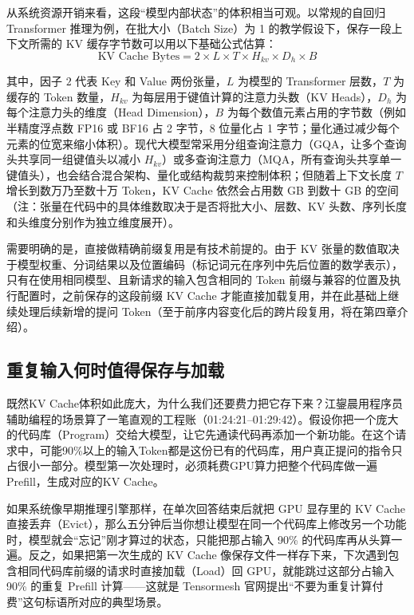\documentclass[UTF8,a4paper,11pt,fontset=fandol]{ctexart}
\begin{document}
从系统资源开销来看，这段“模型内部状态”的体积相当可观。以常规的自回归 Transformer 推理为例，在批大小（Batch Size）为 1 的教学假设下，保存一段上下文所需的 KV 缓存字节数可以用以下基础公式估算：
\[
\text{KV Cache Bytes} = 2 \times L \times T \times H_{kv} \times D_h \times B
\]

其中，因子 \(2\) 代表 Key 和 Value 两份张量，\(L\) 为模型的 Transformer 层数，\(T\) 为缓存的 Token 数量，\(H_{kv}\) 为每层用于键值计算的注意力头数（KV Heads），\(D_h\) 为每个注意力头的维度（Head Dimension），\(B\) 为每个数值元素占用的字节数（例如半精度浮点数 FP16 或 BF16 占 2 字节，8 位量化占 1 字节；量化通过减少每个元素的位宽来缩小体积）。现代大模型常采用分组查询注意力（GQA，让多个查询头共享同一组键值头以减小 \(H_{kv}\)）或多查询注意力（MQA，所有查询头共享单一键值头），也会结合混合架构、量化或结构裁剪来控制体积；但随着上下文长度 \(T\) 增长到数万乃至数十万 Token，KV Cache 依然会占用数 GB 到数十 GB 的空间（注：张量在代码中的具体维数取决于是否将批大小、层数、KV 头数、序列长度和头维度分别作为独立维度展开）。

需要明确的是，直接做精确前缀复用是有技术前提的。由于 KV 张量的数值取决于模型权重、分词结果以及位置编码（标记词元在序列中先后位置的数学表示），只有在使用相同模型、且新请求的输入包含相同的 Token 前缀与兼容的位置及执行配置时，之前保存的这段前缀 KV Cache 才能直接加载复用，并在此基础上继续处理后续新增的提问 Token（至于前序内容变化后的跨片段复用，将在第四章介绍）。

\subsection{重复输入何时值得保存与加载}
既然KV Cache体积如此庞大，为什么我们还要费力把它存下来？江鋆晨用程序员辅助编程的场景算了一笔直观的工程账（01:24:21–01:29:42）。假设你把一个庞大的代码库（Program）交给大模型，让它先通读代码再添加一个新功能。在这个请求中，可能90\%以上的输入Token都是这份已有的代码库，用户真正提问的指令只占很小一部分。模型第一次处理时，必须耗费GPU算力把整个代码库做一遍Prefill，生成对应的KV Cache。

如果系统像早期推理引擎那样，在单次回答结束后就把 GPU 显存里的 KV Cache 直接丢弃（Evict），那么五分钟后当你想让模型在同一个代码库上修改另一个功能时，模型就会“忘记”刚才算过的状态，只能把那占输入 90\% 的代码库再从头算一遍。反之，如果把第一次生成的 KV Cache 像保存文件一样存下来，下次遇到包含相同代码库前缀的请求时直接加载（Load）回 GPU，就能跳过这部分占输入 90\% 的重复 Prefill 计算——这就是 Tensormesh 官网提出“不要为重复计算付费”这句标语所对应的典型场景。
\end{document}
